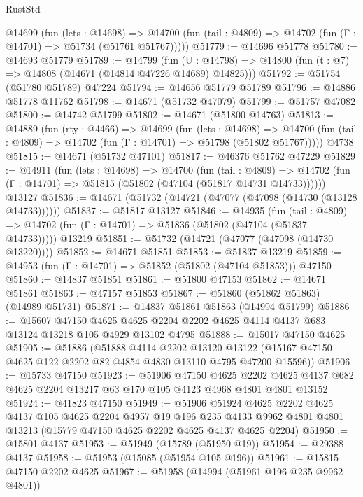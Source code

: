 \begin{lexlean}{RustStd}
\begin{coremodule}
    @14699
      (fun (lets : @14698) =>
      @14700 (fun (tail : @4809) => @14702 (fun (Γ : @14701) => @51734 (@51761 @51767)))))
@51779 := @14696 @51778
@51780 := @14693 @51779
@51789 := @14799
    (fun (U : @14798) => @14800 (fun (t : @7) => @14808 (@14671 (@14814 @47226 @14689) @14825)))
@51792 := @51754 (@51780 @51789) @47224
@51794 := @14656 @51779 @51789
@51796 := @14886 @51778 @11762
@51798 := @14671 (@51732 @47079)
@51799 := @51757 @47082
@51800 := @14742 @51799
@51802 := @14671 (@51800 @14763)
@51813 := @14889
    (fun (rty : @4466) =>
    @14699
      (fun (lets : @14698) =>
      @14700 (fun (tail : @4809) => @14702 (fun (Γ : @14701) => @51798 (@51802 @51767)))))
    @4738
@51815 := @14671 (@51732 @47101)
@51817 := @46376 @51762 @47229
@51829 := @14911
    (fun (lets : @14698) =>
    @14700
      (fun (tail : @4809) =>
      @14702 (fun (Γ : @14701) => @51815 (@51802 (@47104 (@51817 @14731 @14733))))))
    @13127
@51836 := @14671 (@51732 (@14721 (@47077 (@47098 (@14730 (@13128 @14733))))))
@51837 := @51817 @13127
@51846 := @14935
    (fun (tail : @4809) => @14702 (fun (Γ : @14701) => @51836 (@51802 (@47104 (@51837 @14733)))))
    @13219
@51851 := @51732 (@14721 (@47077 (@47098 (@14730 @13220))))
@51852 := @14671 @51851
@51853 := @51837 @13219
@51859 := @14953 (fun (Γ : @14701) => @51852 (@51802 (@47104 @51853))) @47150
@51860 := @14837 @51851
@51861 := @51800 @47153
@51862 := @14671 @51861
@51863 := @47157 @51853
@51867 := @51860 (@51862 @51863) (@14989 @51731)
@51871 := @14837 @51861 @51863 (@14994 @51799)
@51886 := @15607
    @47150
    @4625
    @4625
    @2204
    @2202
    @4625
    @4114
    @4137
    @683
    @13124
    @13218
    @105
    @4929
    @13102
    @4795
@51888 := @15017 @47150 @4625
@51905 := @51886
    (@51888
      @4114
      @2202
      @13120
      @13122
      (@15167 @47150 @4625 @122 @2202 @82 @4854 @4830 @13110 @4795 @47200 @15596))
@51906 := @15733 @47150
@51923 := @51906
    @47150
    @4625
    @2202
    @4625
    @4137
    @682
    @4625
    @2204
    @13217
    @63
    @170
    @105
    @4123
    @4968
    @4801
    @4801
    @13152
@51924 := @41823 @47150
@51949 := @51906
    @51924
    @4625
    @2202
    @4625
    @4137
    @105
    @4625
    @2204
    @4957
    @19
    @196
    @235
    @4133
    @9962
    @4801
    @4801
    @13213
    (@15779 @47150 @4625 @2202 @4625 @4137 @4625 @2204)
@51950 := @15801 @4137
@51953 := @51949 (@15789 (@51950 @19))
@51954 := @29388 @4137
@51958 := @51953 (@15085 (@51954 @105 @196))
@51961 := @15815 @47150 @2202 @4625
@51967 := @51958 (@14994 (@51961 @196 @235 @9962 @4801))

\end{coremodule}
\end{lexlean}
